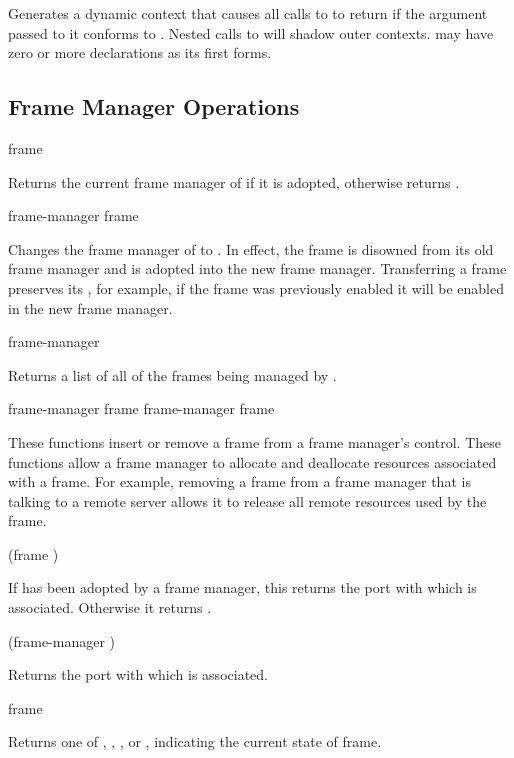 {Generates a dynamic context that causes all calls to  to
return  if the  argument passed to it conforms to
.  Nested calls to  will shadow outer
contexts.   may have zero or more declarations as its first forms.


\subsection {Frame Manager Operations}

 {frame} 

Returns the current frame manager of  if it is adopted, otherwise
returns .

 {frame-manager frame}

Changes the frame manager of  to .  In effect, the
frame is disowned from its old frame manager and is adopted into the new frame
manager.  Transferring a frame preserves its , for example, if
the frame was previously enabled it will be enabled in the new frame manager.

 {frame-manager} 

Returns a list of all of the frames being managed by .
\ReadOnly

 {frame-manager frame}
 {frame-manager frame} 

These functions insert or remove a frame from a frame manager's control.  These
functions allow a frame manager to allocate and deallocate resources associated
with a frame.  For example, removing a frame from a frame manager that is
talking to a remote server allows it to release all remote resources used by the
frame.

 {(frame )}

If  has been adopted by a frame manager, this returns the port with
which  is associated.  Otherwise it returns .

 {(frame-manager )}

Returns the port with which  is associated.

 {frame}

Returns one of , , , or ,
indicating the current state of frame.

}
